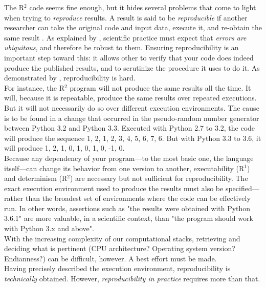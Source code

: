 \documentclass[a4paper,11pt]{article}
\begin{document}
The R$^2$ code seems fine enough, but it hides several problems that come to light when trying to {\em reproduce} results. A result is said to be \emph{reproducible} if another researcher can take the original code and input data, execute it, and re-obtain the same result \parencite{Peng:2006}. As explained by \citeauthor{Donoho:2009} \parencite{Donoho:2009}, scientific practice must expect that {\em errors are ubiquitous}, and therefore be robust to them. Ensuring reproducibility is an important step toward this: it allows other to verify that your code does indeed produce the published results, and to scrutinize the procedure it uses to do it. As demonstrated by \citeauthor{Mesnard:2016} \citep{Mesnard:2016}, reproducibility is hard.\\

For instance, the R$^2$ program will not produce the same results all the time. It will, because it is repeatable, produce the same results over repeated executions. But it will not necessarily do so over different execution environments. The cause is to be found in a change that occurred in the pseudo-random number generator between Python 3.2 and Python 3.3. Executed with Python 2.7 to 3.2, the code will produce the sequence 1, 2, 1, 2, 3, 4, 5, 6, 7, 6. But with Python 3.3 to 3.6, it will produce 1, 2, 1, 0, 1, 0, 1, 0, -1, 0.\\

Because any dependency of your program---to the most basic one, the language itself---can change its behavior from one version to another, executability (R$^1$) and determinism (R$^2$) are necessary but not sufficient for reproducibility. The exact execution environment used to produce the results must also be specified---rather than the broadest set of environments where the code can be effectively run. In other words, assertions such as "the results were obtained with Python 3.6.1" are more valuable, in a scientific context, than "the program should work with Python 3.x and above".\\

With the increasing complexity of our computational stacks, retrieving and deciding what is pertinent (CPU architecture? Operating system version? Endianness?) can be difficult, however. A best effort must be made.\\

Having precisely described the execution environment, reproducibility is \emph{technically} obtained. However, \emph{reproducibility in practice} requires more than that.\\
\end{document}
